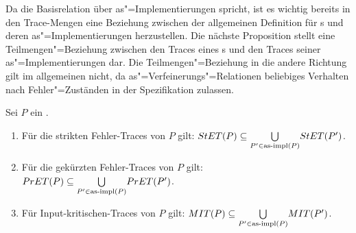 Da die Basisrelation über as"=Implementierungen spricht, ist es wichtig bereits
in den Trace-Mengen eine Beziehung zwischen der allgemeinen Definition für
\MEIO{}s und deren as"=Implementierungen herzustellen. Die nächste Proposition
stellt eine Teilmengen"=Beziehung zwischen den Traces eines \MEIO{}s und den
Traces seiner as"=Implementierungen dar. Die Teilmengen"=Beziehung in die
andere Richtung gilt im allgemeinen nicht, da as"=Verfeinerungs"=Relationen
beliebiges Verhalten nach Fehler"=Zuständen in der Spezifikation zulassen.

\begin{Prop}
  \label{KommTracesProp}
  Sei $P$ ein \MEIO{}.
  \begin{enumerate}
    \item Für die strikten Fehler-Traces von $P$ gilt: $StET (P) \subseteq
      \underset{P' \in\mathrm{as}\text{-}\mathrm{impl} (P)}{\bigcup} StET (P')$.
    \item Für die gekürzten Fehler-Traces von $P$ gilt: $PrET (P) \subseteq
      \underset{P' \in\mathrm{as}\text{-}\mathrm{impl} (P)}{\bigcup} PrET (P')$.
    \item Für Input-kritischen-Traces von $P$ gilt: $MIT (P) \subseteq
      \underset{P' \in\mathrm{as}\text{-}\mathrm{impl} (P)}{\bigcup} MIT (P')$.
  \end{enumerate}
\end{Prop}
